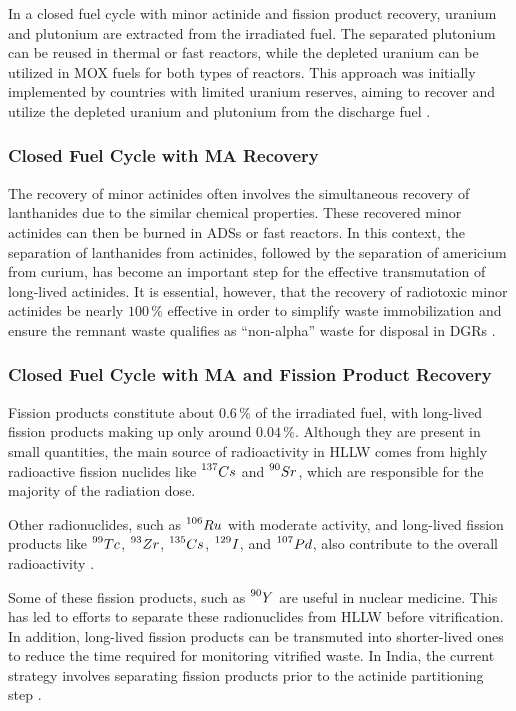 In a closed fuel cycle with minor actinide and fission product recovery, uranium and plutonium are extracted from the irradiated fuel. The separated plutonium can be reused in thermal or fast reactors, while the depleted uranium can be utilized in MOX fuels for both types of reactors. This approach was initially implemented by countries with limited uranium reserves, aiming to recover and utilize the depleted uranium and plutonium from the discharge fuel \cite{fuel_cycle_book}.


\subsubsection{Closed Fuel Cycle with MA Recovery}

The recovery of minor actinides often involves the simultaneous recovery of lanthanides due to the similar chemical properties. These recovered minor actinides can then be burned in ADSs or fast reactors. In this context, the separation of lanthanides from actinides, followed by the separation of americium from curium, has become an important step for the effective transmutation of long-lived actinides. It is essential, however, that the recovery of radiotoxic minor actinides be nearly \(100 \, \%\) effective in order to simplify waste immobilization and ensure the remnant waste qualifies as ``non-alpha'' waste for disposal in DGRs \cite{fuel_cycle_book}.

\subsubsection{Closed Fuel Cycle with MA and Fission Product Recovery}

Fission products constitute about \(0.6 \, \%\) of the irradiated fuel, with long-lived fission products making up only around \(0.04 \, \%\). Although they are present in small quantities, the main source of radioactivity in HLLW comes from highly radioactive fission nuclides like \(\prescript{137}{}{Cs}\) and \(\prescript{90}{}{Sr}\), which are responsible for the majority of the radiation dose. 

Other radionuclides, such as \(\prescript{106}{}{Ru}\) with moderate activity, and long-lived fission products like \(\prescript{99}{}{Tc}\), \(\prescript{93}{}{Zr}\), \(\prescript{135}{}{Cs}\), \(\prescript{129}{}{I}\), and \(\prescript{107}{}{Pd}\), also contribute to the overall radioactivity \cite{fuel_cycle_book}.

Some of these fission products, such as \(\prescript{90}{}{Y}\) are useful in nuclear medicine. This has led to efforts to separate these radionuclides from HLLW before vitrification. In addition, long-lived fission products can be transmuted into shorter-lived ones to reduce the time required for monitoring vitrified waste. In India, the current strategy involves separating fission products prior to the actinide partitioning step \cite{fuel_cycle_book}.

